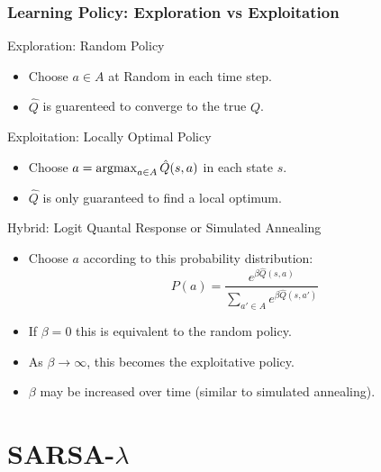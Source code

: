 \documentclass[ignorenonframetext]{beamer}
\newcommand{\argmax}{\operatornamewithlimits{argmax}}
\begin{document}
\begin{frame}[allowframebreaks]
	\frametitle{Learning Policy: Exploration vs Exploitation}
	\begin{block}{Exploration: Random Policy}
		\begin{itemize}
			\item Choose $a \in A$ at Random in each time step.
			\item $\hat{Q}$ is guarenteed to converge to the true $Q$.
		\end{itemize}
	\end{block}
	\begin{block}{Exploitation: Locally Optimal Policy}
		\begin{itemize}
			\item Choose $a = \argmax_{a\in A} \hat{Q}(s,a)$ in each state
				$s$.
			\item $\hat{Q}$ is only guaranteed to find a local optimum.
		\end{itemize}
	\end{block}
	\begin{block}{Hybrid: Logit Quantal Response or Simulated Annealing}
		\begin{itemize}
			\item Choose $a$ according to this probability distribution:
				\[
				P(a) = \frac{e^{\beta\hat{Q}(s,a)}}{\sum_{a'\in
				A}e^{\beta\hat{Q}(s,a')}}
				\]
			\item If $\beta = 0$ this is equivalent to the random policy.
			\item As $\beta \to \infty$, this becomes the exploitative
				policy.
			\item $\beta$ may be increased over time (similar to simulated
				annealing).
		\end{itemize}
	\end{block}
\end{frame}

\section{SARSA-$\lambda$}
\end{document}
